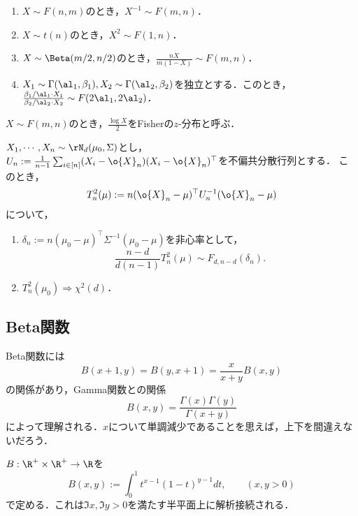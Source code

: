 \documentclass[uplatex,dvipdfmx]{jsreport}
\begin{document}
\begin{proposition}[F-分布に関連する分布]\mbox{}
    \begin{enumerate}
        \item $X\sim F(n,m)$のとき，$X^{-1}\sim F(m,n)$．
        \item $X\sim t(n)$のとき，$X^2\sim F(1,n)$．
        \item $X\sim\Beta(m/2,n/2)$のとき，$\frac{nX}{m(1-X)}\sim F(m,n)$．
        \item $X_1\sim\Gamma(\al_1,\beta_1),X_2\sim\Gamma(\al_2,\beta_2)$を独立とする．このとき，$\frac{\beta_1/\al_1\cdot X_1}{\beta_2/\al_2\cdot X_2}\sim F(2\al_1,2\al_2)$．
    \end{enumerate}
\end{proposition}
\begin{history}
    $X\sim F(m,n)$のとき，$\frac{\log X}{2}$をFisherの$z$-分布と呼ぶ．
\end{history}

\begin{proposition}
    $X_1,\cdots,X_n\sim\rN_d(\mu_0,\Sigma)$とし，$U_n:=\frac{1}{n-1}\sum_{i\in[n]}(X_i-\o{X}_n)(X_i-\o{X}_n)^\top$を不偏共分散行列とする．
    このとき，
    \[T_n^2(\mu):=n(\o{X}_n-\mu)^\top U^{-1}_n(\o{X}_n-\mu)\]
    について，
    \begin{enumerate}
        \item $\delta_n:=n(\mu_0-\mu)^\top\Sigma^{-1}(\mu_0-\mu)$を非心率として，
        \[\frac{n-d}{d(n-1)}T^2_n(\mu)\sim F_{d,n-d}(\delta_n).\]
        \item $T_n^2(\mu_0)\Rightarrow\chi^2(d)$．
    \end{enumerate}
\end{proposition}

\subsection{Beta関数}

\begin{tcolorbox}[colframe=ForestGreen, colback=ForestGreen!10!white,breakable,colbacktitle=ForestGreen!40!white,coltitle=black,fonttitle=\bfseries\sffamily,
title=]
    Beta関数には
    \[B(x+1,y)=B(y,x+1)=\frac{x}{x+y}B(x,y)\]
    の関係があり，Gamma関数との関係
    \[B(x,y)=\frac{\Gamma(x)\Gamma(y)}{\Gamma(x+y)}\]
    によって理解される．$x$について単調減少であることを思えば，上下を間違えないだろう．
\end{tcolorbox}

\begin{definition}
    $B:\R^+\times\R^+\to\R$を
    \[B(x,y):=\int^1_0t^{x-1}(1-t)^{y-1}dt,\qquad(x,y>0)\]
    で定める．これは$\Im x,\Im y>0$を満たす半平面上に解析接続される．
\end{definition}
\end{document}
